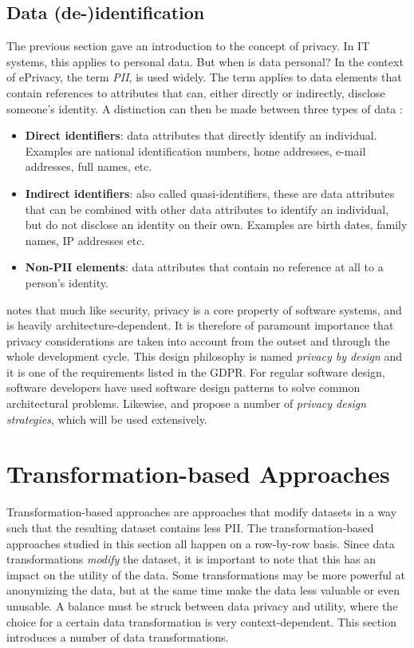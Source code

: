 \subsection{Data (de-)identification}
\label{sec:data-deid}
The previous section gave an introduction to the concept of privacy. In IT systems, this applies to personal data. But when is data personal? In the context of ePrivacy, the term \textit{\gls{PII}}, is used widely. The term applies to data elements that contain references to attributes that can, either directly or indirectly, disclose someone's identity. A distinction can then be made between three types of data \citep{de-id-taxonomy}:
\begin{itemize}
    \item \textbf{Direct identifiers}: data attributes that directly identify an individual. Examples are national identification numbers, home addresses, e-mail addresses, full names, etc.
    \item \textbf{Indirect identifiers}: also called quasi-identifiers, these are data attributes that can be combined with other data attributes to identify an individual, but do not disclose an identity on their own. Examples are birth dates, family names, IP addresses etc.
    \item \textbf{Non-PII elements}: data attributes that contain no reference at all to a person's identity.
\end{itemize}
\noindent \citeauthor{privacy-design-strategies} notes that much like security, privacy is a core property of software systems, and is heavily architecture-dependent. It is therefore of paramount importance that privacy considerations are taken into account from the outset and through the whole development cycle. This design philosophy is named \textit{privacy by design} and it is one of the requirements listed in the GDPR. For regular software design, software developers have used software design patterns to solve common architectural problems. Likewise, \citet{privacy-design-strategies} and \citet{de-id-taxonomy} propose a number of \textit{privacy design strategies}, which will be used extensively.

\section{Transformation-based Approaches}
\label{sec:transformation-approaches}
Transformation-based approaches are approaches that modify datasets in a way such that the resulting dataset contains less \gls{PII}. The transformation-based approaches studied  in this section all happen on a row-by-row basis. Since data transformations \textit{modify} the dataset, it is important to note that this has an impact on the utility of the data. Some transformations may be more powerful at anonymizing the data, but at the same time make the data less valuable or even unusable. A balance must be struck between data privacy and utility, where the choice for a certain data transformation is very context-dependent. This section introduces a number of data transformations.

